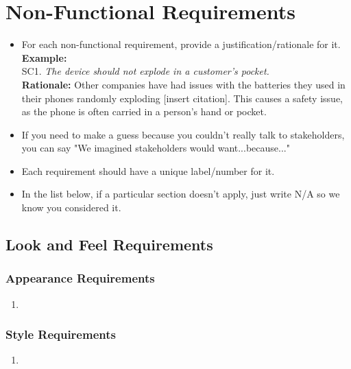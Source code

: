 \documentclass[]{article}
\begin{document}

\section{Non-Functional Requirements}
\label{sec:non-functional_requirements}


\begin{itemize}
	\item For each non-functional requirement, provide a justification/rationale for it.\\
	{\bf Example:} \\
	SC1. \emph{The device should not explode in a customer’s pocket.}\\
	{\bf Rationale:} Other companies have had issues with the batteries they used in their phones randomly exploding [insert citation]. This causes a safety issue, as the phone is often carried in a person's hand or pocket.	
	\item If you need to make a guess because you couldn't really talk to stakeholders, you can say "We imagined stakeholders would want...because..."
	\item Each requirement should have a unique label/number for it.
	\item In the list below, if a particular section doesn't apply, just write N/A so we know you considered it.
\end{itemize}

\subsection{Look and Feel Requirements}
\label{sub:look_and_feel_requirements}

\subsubsection{Appearance Requirements}
\label{ssub:appearance_requirements}
\begin{enumerate}[{LF-A}1. ]
	\item 
\end{enumerate}

\subsubsection{Style Requirements}
\label{ssub:style_requirements}
\begin{enumerate}[{LF-S}1. ]
	\item 
\end{enumerate}
\end{document}
